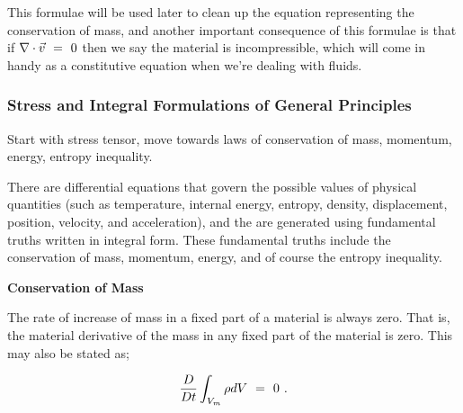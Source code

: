 \documentclass{article}
\newcounter{subsubsubsection}[subsubsection]
\begin{document}
This formulae will be used later to clean up the equation representing the conservation of mass, and another important consequence of this formulae is that if \begin{math} \nabla \cdot \vec{v} \hspace{0.125cm} = \hspace{0.125cm} 0 \end{math} then we say the material is incompressible, which will come in handy as a constitutive equation when we're dealing with fluids. 



\subsubsection{Stress and Integral Formulations of General Principles}

Start with stress tensor, move towards laws of conservation of mass, momentum, energy, entropy inequality. 





There are differential equations that govern the possible values of physical quantities (such as temperature, internal energy, entropy, density, displacement, position, velocity, and acceleration), and the are generated using fundamental truths written in integral form. These fundamental truths include the conservation of mass, momentum, energy, and of course the entropy inequality.

\vspace{0.5cm}

\textbf{Conservation of Mass}
 
The rate of increase of mass in a fixed part of a material is always zero. That is, the material derivative of the mass in any fixed part of the material is zero. This may also be stated as;

\begin{equation} \label{eq:1}
\frac{D}{D t} \int_{V_m} \rho dV \hspace{0.125cm} = \hspace{0.125cm} 0 \hspace{0.125cm}  . 
\end{equation} 
\end{document}
